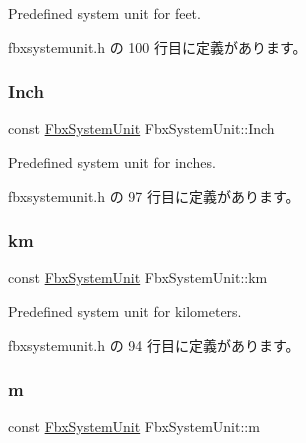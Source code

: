 Predefined system unit for feet. 



 fbxsystemunit.\+h の 100 行目に定義があります。

\mbox{\label{class_fbx_system_unit_a88862a2baeb2e510e1f39ef9d09aa0c4}} 
\subsubsection{\texorpdfstring{Inch}{Inch}}
{\footnotesize\ttfamily const \hyperlink{class_fbx_system_unit}{Fbx\+System\+Unit} Fbx\+System\+Unit\+::\+Inch\hspace{0.3cm}{\ttfamily [static]}}



Predefined system unit for inches. 



 fbxsystemunit.\+h の 97 行目に定義があります。

\mbox{\label{class_fbx_system_unit_abc5367c578e2fe6975baae0ffbff2d63}} 
\subsubsection{\texorpdfstring{km}{km}}
{\footnotesize\ttfamily const \hyperlink{class_fbx_system_unit}{Fbx\+System\+Unit} Fbx\+System\+Unit\+::km\hspace{0.3cm}{\ttfamily [static]}}



Predefined system unit for kilometers. 



 fbxsystemunit.\+h の 94 行目に定義があります。

\mbox{\label{class_fbx_system_unit_ad769a9a9b50605abe42d500ac7c99d28}} 
\subsubsection{\texorpdfstring{m}{m}}
{\footnotesize\ttfamily const \hyperlink{class_fbx_system_unit}{Fbx\+System\+Unit} Fbx\+System\+Unit\+::m\hspace{0.3cm}{\ttfamily [static]}}



